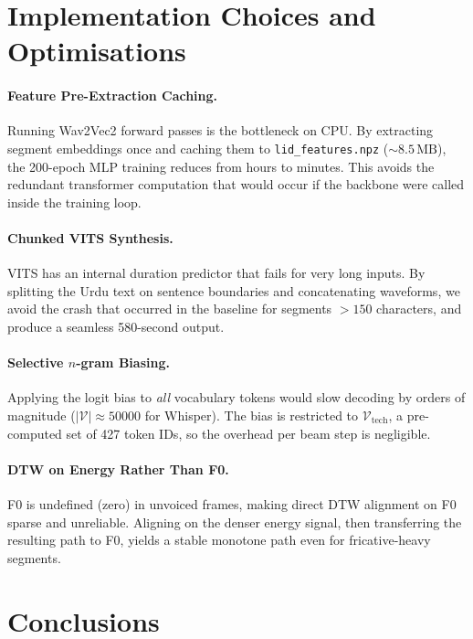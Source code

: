 \documentclass[10pt,twocolumn]{article}
\begin{document}
\section{Implementation Choices and Optimisations}\label{sec:impl}

\paragraph{Feature Pre-Extraction Caching.}
Running Wav2Vec2 forward passes is the bottleneck on CPU. By extracting segment embeddings once and caching them to \texttt{lid\_features.npz} ($\sim\!8.5\,\text{MB}$), the 200-epoch MLP training reduces from hours to minutes. This avoids the redundant transformer computation that would occur if the backbone were called inside the training loop.

\paragraph{Chunked VITS Synthesis.}
VITS has an internal duration predictor that fails for very long inputs. By splitting the Urdu text on sentence boundaries and concatenating waveforms, we avoid the crash that occurred in the baseline for segments $> 150$ characters, and produce a seamless 580-second output.

\paragraph{Selective $n$-gram Biasing.}
Applying the logit bias to \emph{all} vocabulary tokens would slow decoding by orders of magnitude ($|\mathcal{V}| \approx 50000$ for Whisper). The bias is restricted to $\mathcal{V}_{\text{tech}}$, a pre-computed set of 427 token IDs, so the overhead per beam step is negligible.

\paragraph{DTW on Energy Rather Than F0.}
F0 is undefined (zero) in unvoiced frames, making direct DTW alignment on F0 sparse and unreliable. Aligning on the denser energy signal, then transferring the resulting path to F0, yields a stable monotone path even for fricative-heavy segments.

\section{Conclusions}\label{sec:concl}
\end{document}
